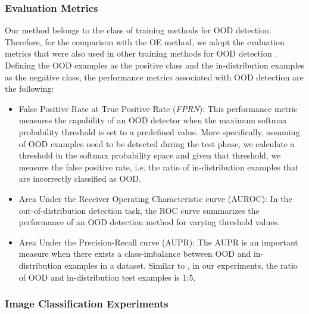 \documentclass{article} \usepackage{iclr2020_conference,times}
\begin{document}
\subsubsection{Evaluation Metrics}\label{similar_metrics}
Our method belongs to the class of training methods for OOD detection. Therefore, for the comparison with the OE method, we adopt the evaluation metrics that were also used in other training methods for OOD detection \citep{hendrycks2019oe,hendrycks2019using,mohseni2020}. Defining the OOD examples as the positive class and the in-distribution examples as the negative class, the performance metrics associated with OOD detection are the following:
\addtolength{\leftskip}{0mm}
  \begin{itemize}[leftmargin=\dimexpr\parindent+0mm+0.5\relax]
  \vspace{-5pt}
  \item False Positive Rate at  True Positive Rate ({\it FPRN}):
  This performance metric \citep{BMVC2016_119,2015arXiv151209272G} measures the capability of an OOD detector when the maximum softmax probability threshold is set to a predefined value. More specifically, assuming  of OOD examples need to be detected during the test phase, we calculate a threshold in the softmax probability space and given that threshold, we measure the false positive rate, i.e. the ratio of in-distribution examples that are incorrectly classified as OOD.
  \item Area Under the Receiver Operating Characteristic curve (AUROC): In the out-of-distribution detection task, the ROC curve \citep{Davis:2006:RPR:1143844.1143874} summarizes the performance of an OOD detection method for varying threshold values.
  \item Area Under the Precision-Recall curve (AUPR): The AUPR \citep{Manning:1999:FSN:311445} is an important measure when there exists a class-imbalance between OOD and in-distribution examples in a dataset. Similar to \cite{hendrycks2019oe}, in our experiments, the ratio of OOD and in-distribution test examples is 1:5.  
\end{itemize}


\subsubsection{Image Classification Experiments}\label{refer_cal_1}
\end{document}
